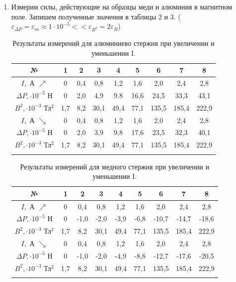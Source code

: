 \documentclass[a4paper, 12pt]{article}%
\begin{document}
\begin{enumerate}
	\item Измерим силы, действующие на образцы меди и алюминия в магнитном поле. Запишем полученные значения в таблицы 2 и 3. ($\varepsilon_{\Delta P} = \varepsilon_m \approx 1 \cdot 10^{-5}  << \varepsilon_{B^2} = 2\varepsilon_{B}$)
	
	\begin{longtable} {|c|c|c|c|c|c|c|c|c|}
		\hline
		№ & 1 & 2 & 3 & 4 & 5 & 6 & 7 & 8 \\ \hline 
		$I, $ А  $\nearrow$ & 0 & 0,4 & 0,8 & 1,2 & 1,6 & 2,0 & 2,4 & 2,8 \\ \hline
		$\Delta P, \cdot 10^{-5}$ Н  & 0 & 2,0 & 4,9 & 9.8 & 16,6 & 24,5 & 33,3 & 43,1 \\ \hline
		$B^2, \cdot 10^{-3}$ Тл$^2$ & 1,7 & 8,2 & 30,1 & 49,4 & 77,1 & 135,5 & 185,4 & 222,9 \\ \hline
		\hline
		$I, $ А  $\searrow$ & 0 & 0,4 & 0,8 & 1,2 & 1,6 & 2,0 & 2,4 & 2,8 \\ \hline
		$\Delta P, \cdot 10^{-5}$ Н  & 0 & 2,0 & 3,9 & 9,8 & 17,6 & 23,5 & 32,3 & 40,1 \\ \hline
		$B^2, \cdot 10^{-3}$ Тл$^2$ & 1,7 & 8,2 & 30,1 & 49,4 & 77,1 & 135,5 & 185,4 & 222,9 \\ \hline
		\caption{Результаты измерений для алюминиево стержня при увеличении и уменьшении I.}
	\end{longtable}
	
	\begin{longtable} {|c|c|c|c|c|c|c|c|c|}
		\hline
		№ & 1 & 2 & 3 & 4 & 5 & 6 & 7 & 8 \\ \hline 
		$I, $ А  $\nearrow$ & 0 & 0,4 & 0,8 & 1,2 & 1,6 & 2,0 & 2,4 & 2,8 \\ \hline
		$\Delta P, \cdot 10^{-5}$ Н  & 0 & -1,0 & -2,0 & -3,9 & -6,8 & -10,7 & -14,7 & -18,6 \\ \hline
		$B^2, \cdot 10^{-3}$ Тл$^2$ & 1,7 & 8,2 & 30,1 & 49,4 & 77,1 & 135,5 & 185,4 & 222,9 \\ \hline
		\hline
		$I, $ А  $\searrow$ & 0 & 0,4 & 0,8 & 1,2 & 1,6 & 2,0 & 2,4 & 2,8 \\ \hline
		$\Delta P, \cdot 10^{-5}$ Н  & 0 & -1,0 & -2,0 & -4,9 & -8,8 & -12,7 & -17,6 & -20,5 \\ \hline
		$B^2, \cdot 10^{-3}$ Тл$^2$ & 1,7 & 8,2 & 30,1 & 49,4 & 77,1 & 135,5 & 185,4 & 222,9 \\ \hline
		\caption{Результаты измерений для медного стержня при увеличении и уменьшении I.}
	\end{longtable}


\end{enumerate}
\end{document}

